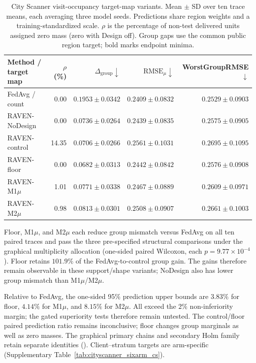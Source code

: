 \documentclass[letterpaper,journal]{IEEEtran}
\begin{document}
\begin{table}[t]
\centering
\caption{City Scanner visit-occupancy target-map variants.
Mean $\pm$ SD over ten trace means, each averaging three model seeds.
Predictions share region weights and a training-standardized scale.
$\rho$ is the percentage of non-test delivered units assigned zero mass
(zero with Design off). Group gaps use the common public region target;
bold marks endpoint minima.}
\label{tab:cityscanner_sixarm}
\footnotesize
\begin{tabular*}{\textwidth}{@{\extracolsep{\fill}}lrrrr@{}}
\toprule
Method / target map & $\rho$ (\%) & $\Delta_{\mathrm{group}}\downarrow$ &
$\mathrm{RMSE}_{\mu}\downarrow$ & WorstGroupRMSE $\downarrow$\\
\midrule
FedAvg / count & 0.00 & $0.1953{\pm}0.0342$ & $\mathbf{0.2409}{\pm}0.0832$ & $\mathbf{0.2529}{\pm}0.0903$\\
RAVEN-NoDesign & 0.00 & $0.0736{\pm}0.0264$ & $0.2439{\pm}0.0835$ & $0.2575{\pm}0.0905$\\
RAVEN-control & 14.35 & $0.0706{\pm}0.0266$ & $0.2561{\pm}0.1031$ & $0.2695{\pm}0.1095$\\
RAVEN-floor & 0.00 & $\mathbf{0.0682}{\pm}0.0313$ & $0.2442{\pm}0.0842$ & $0.2576{\pm}0.0908$\\
RAVEN-M1$\mu$ & 1.01 & $0.0771{\pm}0.0338$ & $0.2467{\pm}0.0889$ & $0.2609{\pm}0.0971$\\
RAVEN-M2$\mu$ & 0.98 & $0.0813{\pm}0.0301$ & $0.2508{\pm}0.0907$ & $0.2661{\pm}0.1003$\\
\bottomrule
\end{tabular*}
\end{table}

Floor, M1$\mu$, and M2$\mu$ each reduce group mismatch versus FedAvg on
all ten paired traces and pass the three pre-specified structural comparisons
under the graphical multiplicity allocation (one-sided paired Wilcoxon,
each $p=9.77\times10^{-4}$). Floor retains $101.9\%$ of the FedAvg-to-control
group gain. The gains therefore remain observable in these support/shape
variants; NoDesign also has lower group mismatch than M1$\mu$/M2$\mu$.

Relative to FedAvg, the one-sided 95\% prediction upper bounds are $3.83\%$
for floor, $4.14\%$ for M1$\mu$, and $8.15\%$ for M2$\mu$. All exceed the
$2\%$ non-inferiority margin;
the gated superiority tests therefore remain untested. The control/floor paired prediction ratio remains inconclusive;
floor changes group marginals as well as zero masses. The graphical primary
chains and secondary Holm family retain separate identities
(). Client--stratum targets are arm-specific
(Supplementary Table~\ref{tab:cityscanner_sixarm_cs}).
\end{document}

